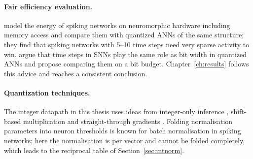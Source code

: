 \paragraph{Fair efficiency evaluation.} \citet{yan2024reconsidering} model the energy of spiking networks on
neuromorphic hardware including memory access and compare them with quantized ANNs of the same structure; they find
that spiking networks with 5--10 time steps need very sparse activity to win. \citet{shen2024efficient} argue that
time steps in SNNs play the same role as bit width in quantized ANNs and propose comparing them on a bit budget.
Chapter~\ref{ch:results} follows this advice and reaches a consistent conclusion.

\paragraph{Quantization techniques.} The integer datapath in this thesis uses ideas from integer-only inference
\citep{jacob2018quantization}, shift-based multiplication \citep{elhoushi2021deepshift} and straight-through
gradients \citep{bengio2013estimating}. Folding normalisation parameters into neuron thresholds is known for batch
normalisation in spiking networks; here the normalisation is per vector and cannot be folded completely, which
leads to the reciprocal table of Section~\ref{sec:intnorm}.
